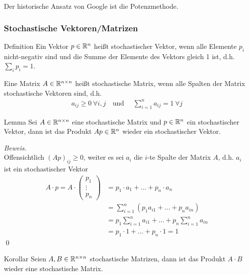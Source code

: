 Der historische Ansatz von Google ist die Potenzmethode.

\subsubsection{Stochastische Vektoren/Matrizen}
\begin{colbox}{Definition}
  Ein Vektor $p\in\mathbb R^n$ heißt stochastischer Vektor, wenn alle Elemente $p_i$ nicht-negativ sind und die 
  Summe der Elemente des Vektors gleich 1 ist, d.h. $\sum_{i} p_i = 1$. 

  Eine Matrix $A\in\mathbb R^{n\times n}$ heißt stochastische Matrix, wenn alle Spalten der Matrix stochastische 
  Vektoren sind, d.h.
  \begin{align*}
    a_{ij}\geq 0\ \forall i,j \quad \text{und } \quad \sum_{i=1}^n a_{ij}=1\ \forall j
  \end{align*}

\end{colbox}

\begin{colbox}{Lemma}
  Sei $A\in\mathbb R^{n\times n}$ eine stochastische Matrix und $p\in\mathbb R^{n}$ ein stochastischer Vektor, dann ist 
  das Produkt $Ap\in\mathbb R^{n}$ wieder ein stochastischer Vektor.
\end{colbox}

\textit{Beweis.} \\
Offensichtlich $(Ap)_{ij}\geq 0$, weiter es sei $a_i$ die $i$-te Spalte der Matrix $A$, d.h. $a_i$ ist ein stochastischer Vektor
\begin{align*}
  A\cdot p = A\cdot \begin{pmatrix}
  p_1 \\ \vdots \\ p_n
\end{pmatrix} &= p_1\cdot a_1 + \dots + p_n\cdot a_n \\
&= \sum_{i=1}^n (p_1a_{i1} + \dots + p_na_{in}) \\
&= p_1\sum_{i=1}^n a_{i1} + \dots +  p_n\sum_{i=1}^na_{in} \\
&= p_1\cdot 1 + \dots + p_n\cdot 1 = 1
\end{align*}
\qed

\begin{colbox}{Korollar}\label{cor:stochMatProd}
  Seien $A,B\in\mathbb R^{n\times n}$ stochastische Matrizen, dann ist das Produkt $A\cdot B$ wieder eine stochastische Matrix.
\end{colbox}

